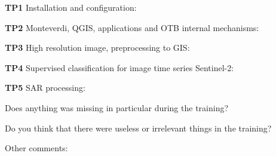 \documentclass[10pt,a4paper]{article}
\begin{document}
\textbf{TP1} Installation and configuration:
\moduleanswer

\textbf{TP2} Monteverdi, QGIS, applications and OTB internal mechanisms:
\moduleanswer

\textbf{TP3} High resolution image, preprocessing to GIS:
\moduleanswer

\textbf{TP4} Supervised classification for image time series Sentinel-2:
\moduleanswer

\textbf{TP5} SAR processing:
\moduleanswer

Does anything was missing in particular during the training?
\vspace{6em}

Do you think that there were useless or irrelevant things in the training? 
\vspace{6em}

Other comments:
\end{document}
